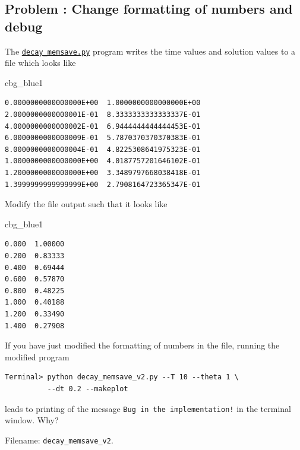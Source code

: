 \documentclass[%
oneside,                 %
final,                   %
10pt]{article}
\newenvironment{_cod_tight}[1]{
   \def\FrameCommand{\colorbox{#1}}
   \FrameRule0.6pt\MakeFramed {\FrameRestore}\vskip3mm}
   {\vskip0mm\endMakeFramed}
\newenvironment{cod}[1]{
\bgroup\rmfamily
\fboxsep=0mm\relax
\begin{_cod_tight}{#1}
\list{}{\parsep=-2mm\parskip=0mm\topsep=0pt\leftmargin=2mm
\rightmargin=2\leftmargin\leftmargin=4pt\relax}
\item\relax}
{\endlist\end{_cod_tight}\egroup}
\newenvironment{doconceexercise}{}{}
\newcounter{doconceexercisecounter}
\begin{document}
\begin{doconceexercise}

\subsection*{Problem \thedoconceexercisecounter: Change formatting of numbers and debug}

\label{decay:exer:inexact:output}

The \href{{http://tinyurl.com/ofkw6kc/alg/decay_memsave.py}}{\nolinkurl{decay_memsave.py}} program
writes the time values and solution values to a file which looks
like
\begin{cod}{cbg_blue1}\begin{Verbatim}[numbers=none,fontsize=\fontsize{9pt}{9pt},baselinestretch=0.95,xleftmargin=2mm]
0.0000000000000000E+00  1.0000000000000000E+00
2.0000000000000001E-01  8.3333333333333337E-01
4.0000000000000002E-01  6.9444444444444453E-01
6.0000000000000009E-01  5.7870370370370383E-01
8.0000000000000004E-01  4.8225308641975323E-01
1.0000000000000000E+00  4.0187757201646102E-01
1.2000000000000000E+00  3.3489797668038418E-01
1.3999999999999999E+00  2.7908164723365347E-01
\end{Verbatim}
\end{cod}
\noindent
Modify the file output such that it looks like
\begin{cod}{cbg_blue1}\begin{Verbatim}[numbers=none,fontsize=\fontsize{9pt}{9pt},baselinestretch=0.95,xleftmargin=2mm]
0.000  1.00000
0.200  0.83333
0.400  0.69444
0.600  0.57870
0.800  0.48225
1.000  0.40188
1.200  0.33490
1.400  0.27908
\end{Verbatim}
\end{cod}
\noindent
If you have just modified the formatting of numbers in the file,
running the modified program
\begin{Verbatim}[frame=lines,label=\fbox{{\tiny Terminal}},framesep=2.5mm,framerule=0.7pt,fontsize=\fontsize{9pt}{9pt}]
Terminal> python decay_memsave_v2.py --T 10 --theta 1 \ 
          --dt 0.2 --makeplot
\end{Verbatim}
leads to printing of the message \Verb?Bug in the implementation!? in the
terminal window. Why?


\noindent Filename: \Verb!decay_memsave_v2!.

\end{doconceexercise}








\cleardoublepage{}  %
\printindex
\end{document}
